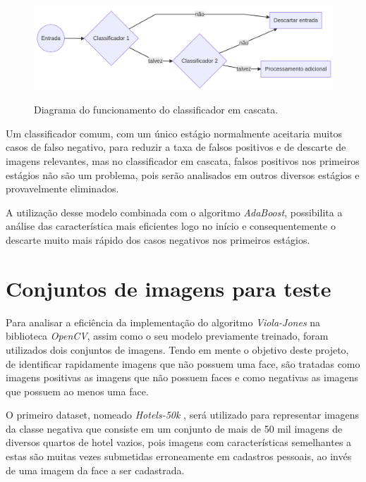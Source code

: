 \begin{figure}[htb]
    \centering
    \caption{Diagrama do funcionamento do classificador em cascata.}
    \includegraphics[scale=.2]{figs/cascade-classifier.png}
    \label{fig:cascade-classifier}
 \end{figure}

 Um classificador comum, com um único estágio normalmente aceitaria muitos casos de falso negativo, para reduzir a taxa de falsos positivos e de descarte de imagens relevantes, mas no classificador em cascata, falsos positivos nos primeiros estágios não são um problema, pois serão analisados em outros diversos estágios e provavelmente eliminados.

 A utilização desse modelo combinada com o algoritmo \textit{AdaBoost}, possibilita a análise das característica mais eficientes logo no início e consequentemente o descarte muito mais rápido dos casos negativos nos primeiros estágios.

 \section{Conjuntos de imagens para teste}

 Para analisar a eficiência da implementação do algoritmo \textit{Viola-Jones} na biblioteca \textit{OpenCV}, assim como o seu modelo previamente treinado, foram utilizados dois conjuntos de imagens. Tendo em mente o objetivo deste projeto, de identificar rapidamente imagens que não possuem uma face, são tratadas como imagens positivas as imagens que não possuem faces e como negativas as imagens que possuem ao menos uma face.

O primeiro dataset, nomeado \textit{Hotels-50k} \cite{hotels50k-article}, será utilizado para representar imagens da classe negativa que consiste em um conjunto de mais de 50 mil imagens de diversos quartos de hotel vazios, pois imagens com características semelhantes a estas são muitas vezes submetidas erroneamente em cadastros pessoais, ao invés de uma imagem da face a ser cadastrada.


